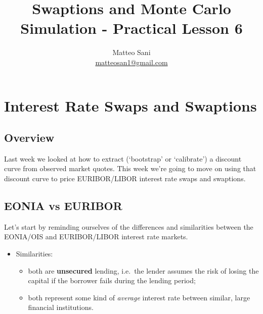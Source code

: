 \documentclass[11pt]{article}
\title{Swaptions and Monte Carlo Simulation - Practical Lesson 6}
\author{Matteo Sani\\ \href{mailto:matteosan1@gmail.com}{matteosan1@gmail.com}}
\providecommand{\tightlist}{%
      \setlength{\itemsep}{0pt}\setlength{\parskip}{0pt}}
\begin{document}
    
    \maketitle
    
    

    
    \hypertarget{interest-rate-swaps-and-swaptions---lesson-6}{%
\section{Interest Rate Swaps and Swaptions}\label{interest-rate-swaps-and-swaptions---lesson-6}}

\hypertarget{overview}{%
\subsection{Overview}\label{overview}}

Last week we looked at how to extract (`bootstrap' or `calibrate') a
discount curve from observed market quotes. This week we're going to
move on using that discount curve to price EURIBOR/LIBOR interest rate
swaps and swaptions.

    \hypertarget{eonia-vs-euribor}{%
\subsection{EONIA vs EURIBOR}\label{eonia-vs-euribor}}

Let's start by reminding ourselves of the differences and similarities
between the EONIA/OIS and EURIBOR/LIBOR interest rate markets.

\begin{itemize}
\tightlist
\item
  Similarities:

  \begin{itemize}
  \tightlist
  \item
    both are \textbf{unsecured} lending, i.e.~the lender assumes the
    risk of losing the capital if the borrower fails during the lending
    period;
  \item
    both represent some kind of \emph{average} interest rate between
    similar, large financial institutions.
  \end{itemize}
\end{itemize}
\end{document}
